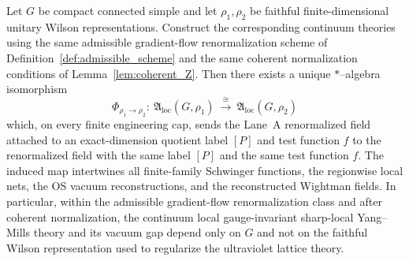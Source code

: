 \begin{theorem}
\label{thm:faithful_Wilson_rep_universality}
Let $G$ be compact connected simple and let $\rho_1,\rho_2$ be faithful finite-dimensional unitary Wilson representations.
Construct the corresponding continuum theories using the same admissible gradient-flow renormalization scheme of Definition~\ref{def:admissible_scheme} and the same coherent normalization conditions of Lemma~\ref{lem:coherent_Z}.
Then there exists a unique $*$--algebra isomorphism
\[
\Phi_{\rho_1\to\rho_2}:\ \mathfrak A_{\mathrm{loc}}(G,\rho_1)\ \xrightarrow{\ \cong\ }\ \mathfrak A_{\mathrm{loc}}(G,\rho_2)
\]
which, on every finite engineering cap, sends the Lane~A renormalized field attached to an exact-dimension quotient label $[P]$ and test function $f$ to the renormalized field with the same label $[P]$ and the same test function $f$.
The induced map intertwines all finite-family Schwinger functions, the regionwise local nets, the OS vacuum reconstructions, and the reconstructed Wightman fields.
In particular, within the admissible gradient-flow renormalization class and after coherent normalization, the continuum local gauge-invariant sharp-local Yang--Mills theory and its vacuum gap depend only on $G$ and not on the faithful Wilson representation used to regularize the ultraviolet lattice theory.
\end{theorem}

